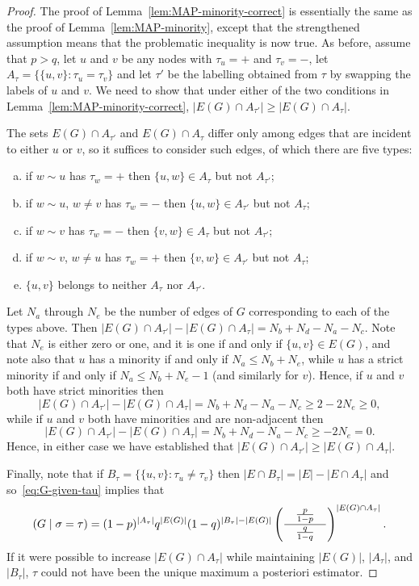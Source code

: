 \documentclass[EJP,final]{ejpecp}
\newcommand{\1}[1]{\mathbbm{1}_{\{#1\}}}
\let\Pr\relax
\DeclareMathOperator{\Pr}{Pr}
\begin{document}
\begin{proof}
    The proof of Lemma~\ref{lem:MAP-minority-correct} is essentially the same as the proof
    of Lemma~\ref{lem:MAP-minority}, except that the strengthened assumption
    means that the problematic inequality is now true.
    As before, assume that $p > q$, let $u$ and $v$ be any nodes with $\tau_u = +$ and $\tau_v = -$,
    let $A_\tau = \{\{u, v\}: \tau_u = \tau_v\}$
    and let $\tau'$ be the labelling obtained from $\tau$ by swapping the labels of $u$ and $v$.
    We need to show that under either of the two conditions in Lemma~\ref{lem:MAP-minority-correct},
    $|E(G) \cap A_{\tau'}| \ge |E(G) \cap A_\tau|$.

    The sets $E(G) \cap A_{\tau'}$ and $E(G) \cap A_\tau$
    differ only among edges that are incident to either $u$ or $v$, so it suffices to consider such edges, of which there are five types:
    \begin{enumerate}[a)]
        \item if $w \sim u$ has $\tau_w = +$ then $\{u, w\} \in A_\tau$ but not $A_{\tau'}$;
        \item if $w \sim u$, $w \ne v$ has $\tau_w = -$ then $\{u, w\} \in A_{\tau'}$ but not $A_\tau$;
        \item if $w \sim v$ has $\tau_w = -$ then $\{v, w\} \in A_\tau$ but not $A_{\tau'}$;
        \item if $w \sim v$, $w \ne u$ has $\tau_w = +$ then $\{v, w\} \in A_{\tau'}$ but not $A_\tau$;
        \item $\{u, v\}$ belongs to neither $A_\tau$ nor $A_{\tau'}$.
    \end{enumerate}
    Let $N_a$ through $N_e$ be the number of edges of $G$ corresponding to each of the types above.
    Then $|E(G) \cap A_{\tau'}| - |E(G) \cap A_\tau| = N_b + N_d - N_a - N_c$.
    Note that $N_e$ is either zero or one, and it is one if and only if $\{u, v\} \in E(G)$, and 
    note also that $u$ has a minority if and only if $N_a \le N_b + N_e$, while $u$
    has a strict minority if and only if $N_a \le N_b + N_e - 1$ (and similarly for $v$).
    Hence, if $u$ and $v$ both have strict minorities then
    \[
        |E(G) \cap A_{\tau'}| - |E(G) \cap A_\tau| = N_b + N_d - N_a - N_c \ge 2 - 2 N_e \ge 0,
    \]
    while if $u$ and $v$ both have minorities and are non-adjacent then
    \[
        |E(G) \cap A_{\tau'}| - |E(G) \cap A_\tau| = N_b + N_d - N_a - N_c \ge - 2 N_e = 0.
    \]
    Hence, in either case we have established that $|E(G) \cap A_{\tau'}| \ge |E(G) \cap A_\tau|$.

    Finally, note that if $B_\tau = \{\{u,v\}: \tau_u \ne \tau_v\}$ then $|E \cap B_\tau| = |E| - |E \cap A_\tau|$ and so~\eqref{eq:G-given-tau}
    implies that
    \[
        \Pr(G \mid \sigma = \tau) = (1-p)^{|A_\tau|} q^{|E(G)|} (1-q)^{|B_\tau| - |E(G)|} \left(
            \frac{\quad\frac{p}{1-p}\quad}{\frac{q}{1-q}}
        \right)^{|E(G) \cap A_\tau|}.
    \]
    If it were possible to increase $|E(G) \cap A_\tau|$ while maintaining $|E(G)|$, $|A_\tau|$, and $|B_\tau|$, $\tau$
    could not have been the unique maximum a posteriori estimator.
\end{proof}
\end{document}
